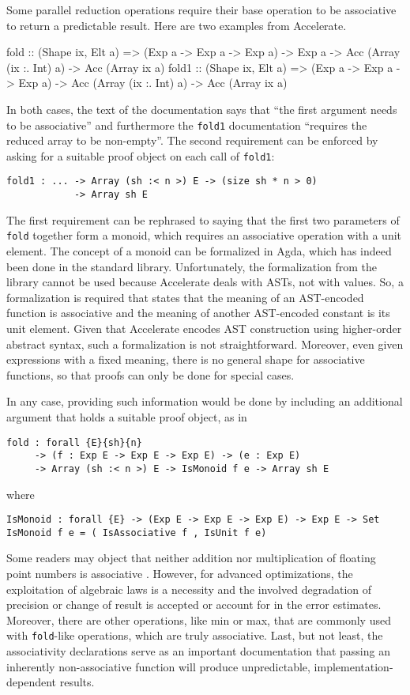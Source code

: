 \documentclass{llncs}
\begin{document}
Some parallel reduction operations require their base operation to be
associative to return a predictable result. Here are two examples from
Accelerate. 
\begin{hcode}
fold  :: (Shape ix, Elt a) =>
         (Exp a -> Exp a -> Exp a) -> Exp a ->
         Acc (Array (ix :. Int) a) -> Acc (Array ix a)
fold1 :: (Shape ix, Elt a) =>
         (Exp a -> Exp a -> Exp a) ->
         Acc (Array (ix :. Int) a) -> Acc (Array ix a)
\end{hcode}
In both cases, the text of the documentation says that ``the first
argument needs to be associative'' and furthermore the \texttt{fold1}
documentation ``requires the reduced array to be non-empty''.
The second requirement can be enforced by asking for a suitable proof
object on each call of \texttt{fold1}:
\begin{verbatim}
fold1 : ... -> Array (sh :< n >) E -> (size sh * n > 0)
            -> Array sh E
\end{verbatim}
The first requirement can be rephrased to saying that the first two
parameters of \texttt{fold} together form a monoid, which requires an
associative operation with a unit element. The concept of a monoid
can be formalized in Agda, which has indeed been done in the standard
library. Unfortunately, the formalization from the library cannot be
used because Accelerate deals with ASTs, not with values. So, a
formalization is required that states that the meaning of an
AST-encoded function is associative and the meaning of another
AST-encoded constant is its unit element. Given that Accelerate
encodes AST construction using higher-order abstract syntax, such a
formalization is not straightforward. Moreover, even given expressions
with a fixed meaning, there is no general shape for associative
functions, so that proofs can only be done for special cases. 

In any case, providing such information would be done by including an
additional argument that holds a suitable proof object, as in
\begin{verbatim}
fold : forall {E}{sh}{n}
     -> (f : Exp E -> Exp E -> Exp E) -> (e : Exp E)
     -> Array (sh :< n >) E -> IsMonoid f e -> Array sh E
\end{verbatim}
where
\begin{verbatim}
IsMonoid : forall {E} -> (Exp E -> Exp E -> Exp E) -> Exp E -> Set
IsMonoid f e = ( IsAssociative f , IsUnit f e)
\end{verbatim}

Some readers may object that neither addition nor multiplication of
floating point numbers is associative
\cite{DBLP:journals/csur/Goldberg91}. However, for advanced
optimizations, the exploitation of algebraic laws is a necessity and
the involved degradation of precision or change of result is accepted
or account for in the error estimates. Moreover, there are
other operations, like min or max, that are commonly used with
\texttt{fold}-like operations, which are truly associative. Last, but
not least, the associativity declarations serve as an important
documentation that passing an inherently non-associative function will
produce unpredictable, implementation-dependent results.
\end{document}

